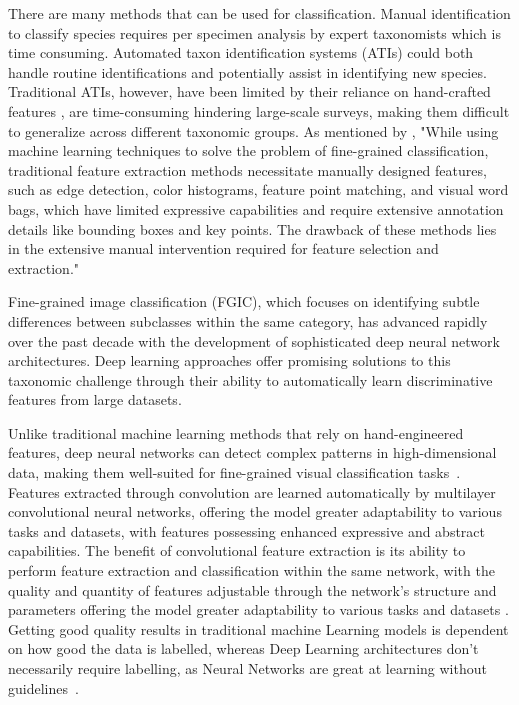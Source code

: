 \documentclass[a4paper,12pt]{report}
\begin{document}
There are many methods that can be used for classification. Manual identification to classify species requires per specimen analysis by expert taxonomists which is time consuming. Automated taxon identification systems (ATIs) could both handle routine identifications and potentially assist in identifying new species. Traditional ATIs, however, have been limited by their reliance on hand-crafted features \citep{valan}, are time-consuming hindering large-scale surveys, making them difficult to generalize across different taxonomic groups. As mentioned by \citep{Lu2024}, "While using machine learning techniques to solve the problem of fine-grained classification, traditional feature extraction methods necessitate manually designed features, such as edge detection, color histograms, feature point matching, and visual word bags, which have limited expressive capabilities and require extensive annotation details like bounding boxes and key points. The drawback of these methods lies in the extensive manual intervention required for feature selection and extraction."

Fine-grained image classification (FGIC), which focuses on identifying subtle differences between subclasses within the same category, has advanced rapidly over the past decade with the development of sophisticated deep neural network architectures. Deep learning approaches offer promising solutions to this taxonomic challenge through their ability to automatically learn discriminative features from large datasets\citep{source4}. 

Unlike traditional machine learning methods that rely on hand-engineered features, deep neural networks can detect complex patterns in high-dimensional data, making them well-suited for fine-grained visual classification tasks~\citep{valan}. Features extracted through convolution are learned automatically by multilayer convolutional neural networks, offering the model greater adaptability to various tasks and datasets, with features possessing enhanced expressive and abstract capabilities. The benefit of convolutional feature extraction is its ability to perform feature extraction and classification within the same network, with the quality and quantity of features adjustable through the network's structure and parameters \citep{source2} offering the model greater adaptability to various tasks and datasets \citep{Lu2024}. Getting good quality results in traditional machine Learning models is dependent on how good the data is labelled, whereas Deep Learning architectures don't necessarily require labelling, as Neural Networks are great at learning without guidelines~\cite{source5}.
\end{document}
